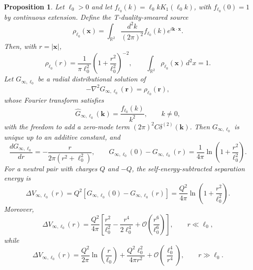 \documentclass[nopacs,amsmath,amsfonts,amssymb,aps,superscriptaddress]{revtex4}
\newtheorem{proposition}{Proposition}[section]
\begin{document}
\begin{proposition}\label{prop:infinite-plane-td}
Let $\ell_0>0$ and let $f_{\ell_0}(k)=\ell_0 kK_1(\ell_0 k)$, with $f_{\ell_0}(0)=1$ by continuous extension. Define the T-duality-smeared source
\begin{equation}
  \rho_{\ell_0}(\mathbf x)
  =\int_{\mathbb R^2}\frac{d^2k}{(2\pi)^2}f_{\ell_0}(k)e^{i\mathbf k\cdot\mathbf x}.
\end{equation}
Then, with $r=|\mathbf x|$,
\begin{equation}\label{density}
  \rho_{\ell_0}(r)
  =\frac{1}{\pi\ell_0^2}\left(1+\frac{r^2}{\ell_0^2}\right)^{-2},
  \qquad
  \int_{\mathbb R^2}\rho_{\ell_0}(\mathbf x)\,d^2x=1.
\end{equation}
Let $G_{\infty,\ell_0}$ be a radial distributional solution of
\begin{equation}\label{Poisson}
  -\nabla^2G_{\infty,\ell_0}(\mathbf r)=\rho_{\ell_0}(\mathbf r),
\end{equation}
whose Fourier transform satisfies
\begin{equation}
  \widehat G_{\infty,\ell_0}(\mathbf k)
  =\frac{f_{\ell_0}(k)}{k^2},
  \qquad k\neq 0,
\end{equation}
with the freedom to add a zero-mode term $(2\pi)^2C\delta^{(2)}(\mathbf k)$. Then $G_{\infty,\ell_0}$ is unique up to an additive constant, and
\begin{equation}\label{equa}
  \frac{dG_{\infty,\ell_0}}{dr}
  =-\frac{r}{2\pi(r^2+\ell_0^2)},
  \qquad
  G_{\infty,\ell_0}(0)-G_{\infty,\ell_0}(r)
  =\frac{1}{4\pi}\ln\left(1+\frac{r^2}{\ell_0^2}\right).
\end{equation}
For a neutral pair with charges $Q$ and $-Q$, the self-energy-subtracted separation energy is
\begin{equation}\label{DeltaV}
  \Delta V_{\infty,\ell_0}(r)
  =Q^2\left[G_{\infty,\ell_0}(0)-G_{\infty,\ell_0}(r)\right]
  =\frac{Q^2}{4\pi}\ln\left(1+\frac{r^2}{\ell_0^2}\right).
\end{equation}
Moreover,
\begin{equation}
  \Delta V_{\infty,\ell_0}(r)
  =\frac{Q^2}{4\pi}\left[
  \frac{r^2}{\ell_0^2}-\frac{r^4}{2\ell_0^4}
  +\mathcal O\left(\frac{r^6}{\ell_0^6}\right)\right],
  \qquad r\ll\ell_0,
\end{equation}
while
\begin{equation}
  \Delta V_{\infty,\ell_0}(r)
  =\frac{Q^2}{2\pi}\ln\left(\frac r{\ell_0}\right)
  +\frac{Q^2\ell_0^2}{4\pi r^2}
  +\mathcal O\left(\frac{\ell_0^4}{r^4}\right),
  \qquad r\gg\ell_0.
\end{equation}
\end{proposition}
\end{document}
